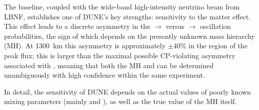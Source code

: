 
The  baseline, coupled with the wide-band
high-intensity neutrino beam from LBNF, establishes one of DUNE's key
strengths: sensitivity to the matter effect. This effect leads to a
discrete asymmetry in the \numu $\to$ \nue versus \anumu $\to$ \anue
oscillation probabilities, the sign of which depends on the presently
unknown mass hierarchy (MH).  At 1300~km this asymmetry is
approximately $\pm 40\%$ in the region of the peak flux; this is
larger than the maximal possible CP-violating asymmetry associated
with \deltacp, meaning that both the MH and \deltacp can be determined
unambiguously with high confidence within the same experiment.

In detail, the sensitivity of DUNE depends on the actual values of
poorly known mixing parameters (mainly \deltacp and
), %
as well as the true value of the MH itself.  

